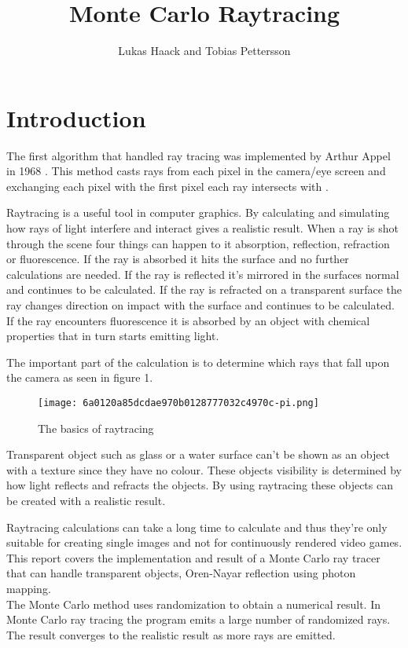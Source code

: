 \documentclass[a4paper,12pt]{IEEEtran}
\begin{document}
\title{Monte Carlo Raytracing}

\author{Lukas Haack and Tobias Pettersson}

\maketitle



\section{Introduction}
The first algorithm that handled ray tracing was implemented by Arthur Appel in 1968 \cite{Arthur Appel}. This method casts rays from each pixel in the camera/eye screen and exchanging each pixel with the first pixel each ray intersects with \cite{Basic Raytracing}. 

Raytracing is a useful tool in computer graphics. By calculating and simulating how rays of light interfere and interact gives a realistic result. When a ray is shot through the scene four things can happen to it absorption, reflection, refraction or fluorescence.
If the ray is absorbed it hits the surface and no further calculations are needed. If the ray is reflected it's mirrored in the surfaces normal and continues to be calculated. If the ray is refracted on a transparent surface the ray changes direction on impact with the surface and continues to be calculated. If the ray encounters fluorescence it is absorbed by an object with chemical properties that in turn starts emitting light.

The important part of the calculation is to determine which rays that fall upon the camera as seen in figure 1. 
\begin{figure}[h!]
\texttt{[image: 6a0120a85dcdae970b0128777032c4970c-pi.png]}
\caption{The basics of raytracing}
\end{figure}
Transparent object such as glass or a water surface can't be shown as an object with a texture since they have no colour. 
These objects visibility is determined by how light reflects and refracts the objects. By using raytracing these objects can be created with a realistic result.


Raytracing calculations can take a long time to calculate and thus they're only suitable for creating single images and not for continuously rendered video games. 
\\
This report covers the implementation and result of a Monte Carlo ray tracer that can handle transparent objects, Oren-Nayar reflection using photon mapping.
\\
The Monte Carlo method uses randomization to obtain a numerical result. 
In Monte Carlo ray tracing the program emits a large number of randomized rays. The result converges to the realistic result as more rays are emitted\cite{Monte Carlo Method}.
\end{document}
